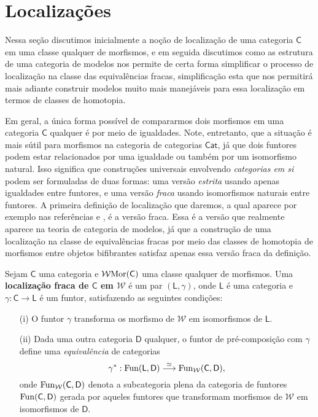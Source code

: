 \section{Localizações}

Nessa seção discutimos inicialmente a noção de localização de uma categoria $\mathsf{C}$ em uma classe qualquer de morfismos, e em seguida discutimos como as estrutura de uma categoria de modelos nos permite de certa forma simplificar o processo de localização na classe das equivalências fracas, simplificação esta que nos permitirá mais adiante construir modelos muito mais manejáveis para essa localização em termos de classes de homotopia.

Em geral, a única forma possível de compararmos dois morfismos em uma categoria $\mathsf{C}$ qualquer é por meio de igualdades.
Note, entretanto, que a situação é mais sútil para morfismos na categoria de categorias $\mathsf{Cat}$, já que dois funtores podem estar relacionados por uma igualdade ou também por um isomorfismo natural.
Isso significa que construções universais envolvendo \emph{categorias em si} podem ser formuladas de duas formas: uma versão \emph{estrita} usando apenas igualdades entre funtores, e uma versão \emph{fraca} usando isomorfismos naturais entre funtores.
A primeira definição de localização que daremos, a qual aparece por exemplo nas referências \cite[Definição 7.30]{heuts-moerdijk} e \cite{nlab:localization}, é a versão fraca.
Essa é a versão que realmente aparece na teoria de categoria de modelos, já que a construção de uma localização na classe de equivalências fracas por meio das classes de homotopia de morfismos entre objetos bifibrantes satisfaz apenas essa versão fraca da definição.

\begin{defin}
  Sejam $\mathsf{C}$ uma categoria e $\mathcal{W} \mathrm{Mor}(\mathsf{C})$ uma classe qualquer de morfismos.
  Uma \textbf{localização fraca de $\mathsf{C}$ em $\mathcal{W}$} é um par $(\mathsf{L},\gamma)$, onde $\mathsf{L}$ é uma categoria e $\gamma: \mathsf{C} \to \mathsf{L}$ é um funtor, satisfazendo as seguintes condições:
  \begin{enumerate}
  \item[(i)] O funtor $\gamma$ transforma os morfismo de $\mathcal{W}$ em isomorfismos de $\mathsf{L}$.
    
  \item[(ii)] Dada uma outra categoria $\mathsf{D}$ qualquer, o funtor de pré-composição com $\gamma$ define uma \emph{equivalência} de categorias
    \begin{displaymath}
      \gamma^{*}: \mathrm{Fun}(\mathsf{L},\mathsf{D}) \overset{\simeq}{\longrightarrow} \mathrm{Fun}_{\mathcal{W}}(\mathsf{C},\mathsf{D}),
    \end{displaymath}
    onde $\mathrm{Fun}_{\mathcal{W}}(\mathsf{C},\mathsf{D})$ denota a subcategoria plena da categoria de funtores $\mathrm{Fun}(\mathsf{C},\mathsf{D})$ gerada por aqueles funtores que transformam morfismos de $\mathcal{W}$ em isomorfismos de $\mathsf{D}$.
  \end{enumerate}
\end{defin}

